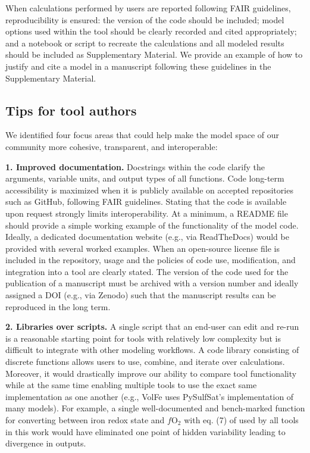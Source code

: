 \documentclass[draft, english]{volcanica-template}
\begin{document}
When calculations performed by users are reported following FAIR guidelines, reproducibility is ensured: the version of the code should be included; model options used within the tool should be clearly recorded and cited appropriately; and a notebook or script to recreate the calculations and all modeled results should be included as Supplementary Material. We provide an example of how to justify and cite a model in a manuscript following these guidelines in the Supplementary Material.

\subsection{Tips for tool authors}
We identified four focus areas that could help make the model space of our community more cohesive, transparent, and interoperable:

\textbf{1. Improved documentation.} Docstrings within the code clarify the arguments, variable units, and output types of all functions. Code long-term accessibility is maximized when it is publicly available on accepted repositories such as GitHub, following FAIR \parencite{wilkinson2016FAIR} guidelines. Stating that the code is available upon request strongly limits interoperability. At a minimum, a README file should provide a simple working example of the functionality of the model code. Ideally, a dedicated documentation website (e.g., via ReadTheDocs) would be provided with several worked examples. When an open-source license file is included in the repository, usage and the policies of code use, modification, and integration into a tool are clearly stated. The version of the code used for the publication of a manuscript must be archived with a version number and ideally assigned a DOI (e.g., via Zenodo) such that the manuscript results can be reproduced in the long term.

\textbf{2. Libraries over scripts.} A single script that an end-user can edit and re-run is a reasonable starting point for tools with relatively low complexity but is difficult to integrate with other modeling workflows. A code library consisting of discrete functions allows users to use, combine, and iterate over calculations. Moreover, it would drastically improve our ability to compare tool functionality while at the same time enabling multiple tools to use the exact same implementation as one another (e.g., VolFe uses PySulfSat's implementation of many models). For example, a single well-documented and bench-marked function for converting between iron redox state and $f$O$_2$ with eq. (7) of \textcite{Kress1991} used by all tools in this work would have eliminated one point of hidden variability leading to divergence in outputs.
\end{document}
